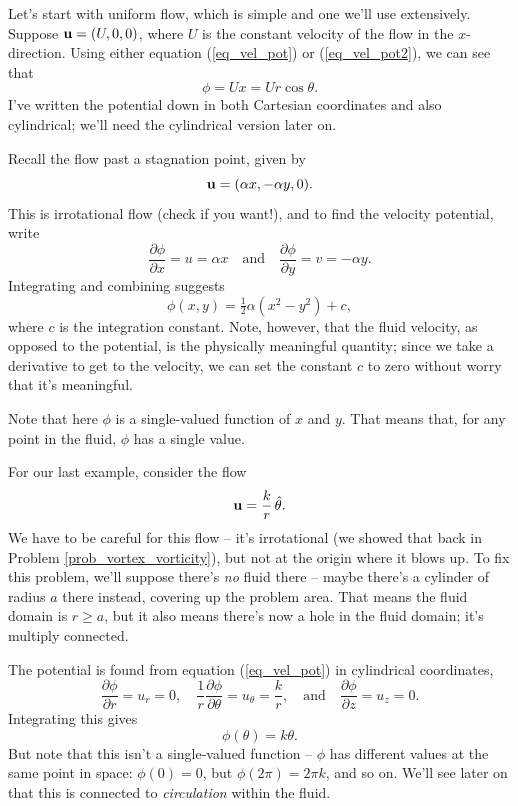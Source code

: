 \begin{example}
\label{ex_uniform}
Let's start with uniform flow, which is simple and one we'll use extensively. Suppose $\mathbf{u} = (U, 0, 0)$, where $U$ is the constant velocity of the flow in the $x$-direction. Using either equation (\ref{eq_vel_pot}) or (\ref{eq_vel_pot2}), we can see that
\begin{equation}
\phi = Ux = U r\cos \theta.
\end{equation} 
I've written the potential down in both Cartesian coordinates and also cylindrical; we'll need the cylindrical version later on.
\end{example}

\begin{example}
Recall the flow past a stagnation point, given by
\[
\mathbf{u} = (\alpha x, -\alpha y, 0).
\]
This is irrotational flow (check if you want!), and to find the velocity potential, write
\[
\frac{\partial \phi}{\partial x} = u = \alpha x \quad \text{and} \quad \frac{\partial \phi}{\partial y} = v = -\alpha y.
\]
Integrating and combining suggests
\[
\phi(x, y) = \tfrac{1}{2} \alpha (x^2 - y^2) + c,
\]
where $c$ is the integration constant.  Note, however, that the fluid velocity, as opposed to the potential, is the physically meaningful quantity; since we take a derivative to get to the velocity, we can set the constant $c$ to zero without worry that it's meaningful.

Note that here $\phi$ is a single-valued function of $x$ and $y$.  That means that, for any point in the fluid, $\phi$ has a single value.
\end{example}

\begin{example}
For our last example, consider the flow
\[
\mathbf{u} = \frac{k}{r} \, \hat{\theta}.
\]
We have to be careful for this flow -- it's irrotational (we showed that back in Problem \ref{prob_vortex_vorticity}), but not at the origin where it blows up.  To fix this problem, we'll suppose there's \emph{no} fluid there -- maybe there's a cylinder of radius $a$ there instead, covering up the problem area.  That means the fluid domain is $r \ge a$, but it also means there's now a hole in the fluid domain; it's multiply connected.

The potential is found from equation (\ref{eq_vel_pot}) in cylindrical coordinates,
\[
\frac{\partial \phi}{\partial r} = u_r = 0, \quad \frac{1}{r} \frac{\partial \phi}{\partial \theta} = u_\theta = \frac{k}{r}, \quad \text{and} \quad \frac{\partial \phi}{\partial z} = u_z = 0.
\]
Integrating this gives
\begin{equation}
\phi(\theta) = k \theta.
\end{equation}
But note that this isn't a single-valued function -- $\phi$ has different values at the same point in space:  $\phi(0) = 0$, but $\phi(2\pi) = 2\pi k$, and so on.  We'll see later on that this is connected to \emph{circulation} within the fluid.

\end{example}

